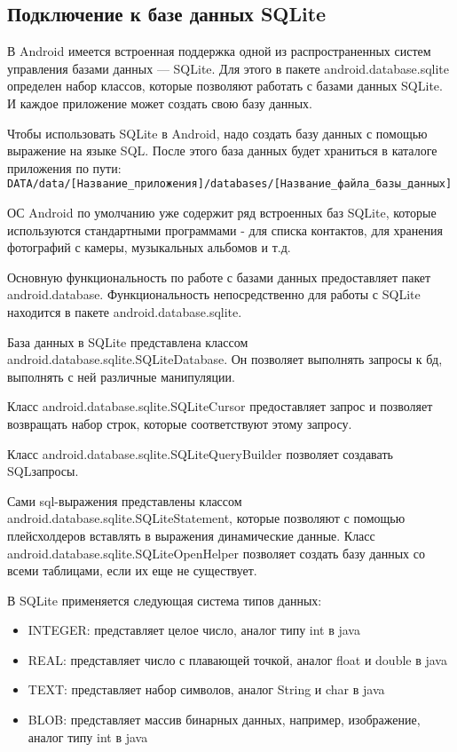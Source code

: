 \subsection{Подключение к базе данных SQLite}
В Android имеется встроенная поддержка одной из распространенных систем
управления базами данных --- SQLite. Для этого в пакете android.database.sqlite
определен набор классов, которые позволяют работать с базами данных
SQLite. И каждое приложение может создать свою базу данных.\par
Чтобы использовать SQLite в Android, надо создать базу данных с помощью
выражение на языке SQL. После этого база данных будет храниться в
каталоге приложения по пути:
\verb|DATA/data/[Название_приложения]/databases/[Название_файла_базы_данных]|

ОС Android по умолчанию уже содержит ряд встроенных баз SQLite, которые
используются стандартными программами - для списка контактов, для
хранения фотографий с камеры, музыкальных альбомов и т.д.\par
Основную функциональность по работе с базами данных предоставляет
пакет android.database. Функциональность непосредственно для работы с
SQLite находится в пакете android.database.sqlite.\par
База данных в SQLite представлена классом
android.database.sqlite.SQLiteDatabase. Он позволяет выполнять запросы к
бд, выполнять с ней различные манипуляции.\par
Класс android.database.sqlite.SQLiteCursor предоставляет запрос и
позволяет возвращать набор строк, которые соответствуют этому запросу.\par
Класс android.database.sqlite.SQLiteQueryBuilder позволяет
создавать SQLзапросы.\par
Сами sql-выражения представлены классом
android.database.sqlite.SQLiteStatement, которые позволяют с помощью
плейсхолдеров вставлять в выражения динамические данные.
Класс android.database.sqlite.SQLiteOpenHelper позволяет создать базу
данных со всеми таблицами, если их еще не существует.\par
В SQLite применяется следующая система типов данных:

\begin{itemize}
	\item INTEGER: представляет целое число, аналог типу int в java
	\item REAL: представляет число с плавающей точкой, аналог float и
		double в java
	\item TEXT: представляет набор символов, аналог String и char в java
	\item BLOB: представляет массив бинарных данных, например,
		изображение, аналог типу int в java
\end{itemize}

